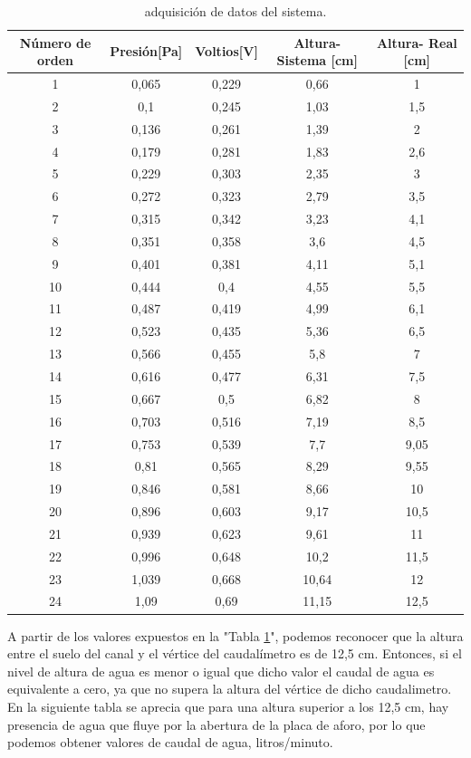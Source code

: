 \begin{table}[h]
	\centering
	\caption[caption corto]{adquisición de datos del sistema.}
	\begin{tabular}{c c c c c}    
		\toprule
		\textbf{Número de orden}   & \textbf{Presión[Pa]}  & \textbf{Voltios[V]} & \textbf{Altura- Sistema [cm]} & \textbf{Altura- Real [cm]} \\
		\midrule
		1  & 0,065 & 0,229  & 0,66  & 1 \\
		2  & 0,1   & 0,245  & 1,03  & 1,5 \\
		3  & 0,136 & 0,261  & 1,39  & 2 \\
		4  & 0,179 & 0,281  & 1,83  & 2,6 \\
		5  & 0,229 & 0,303	& 2,35  & 3  \\
		6  & 0,272 & 0,323  & 2,79  & 3,5 \\
		7  & 0,315 & 0,342	& 3,23  & 4,1 \\
		8  & 0,351 & 0,358	& 3,6   & 4,5   \\
		9  & 0,401 & 0,381	& 4,11	& 5,1 \\
		10 & 0,444 & 0,4	& 4,55	& 5,5 \\
		11 & 0,487 & 0,419	& 4,99	& 6,1 \\
		12 & 0,523 & 0,435	& 5,36	& 6,5 \\
		13 & 0,566 & 0,455	& 5,8	& 7 \\
		14 & 0,616 & 0,477	& 6,31	& 7,5 \\
		15 & 0,667 & 0,5	& 6,82	& 8 \\
		16 & 0,703 & 0,516	& 7,19	& 8,5 \\
		17 & 0,753 & 0,539	& 7,7	& 9,05 \\
		18 & 0,81  & 0,565	& 8,29	& 9,55 \\
		19 & 0,846 & 0,581	& 8,66	& 10 \\
		20 & 0,896 & 0,603	& 9,17	& 10,5 \\
		21 & 0,939 & 0,623	& 9,61	& 11 \\
		22 & 0,996 & 0,648	& 10,2	& 11,5 \\
		23 & 1,039 & 0,668	& 10,64	& 12\\
		24 & 1,09  & 0,69	& 11,15	& 12,5 \\

	
		\bottomrule
		\hline
	\end{tabular}
	\label{tab:adquisición de datos del sistema.}
\end{table}
A partir de los valores expuestos en la "Tabla \ref{tab:adquisición de datos del sistema.}", podemos reconocer que la altura entre el suelo del canal y el vértice del caudalímetro es de 12,5 cm. Entonces, si el nivel de altura de agua es menor o igual que dicho valor el caudal de agua es equivalente a cero, ya que no supera la altura del vértice de dicho caudalimetro.
En la siguiente tabla se aprecia que para una altura superior a los 12,5 cm, hay presencia de agua que fluye por la abertura de la placa de aforo, por lo que podemos obtener valores de caudal de agua, litros/minuto. 


